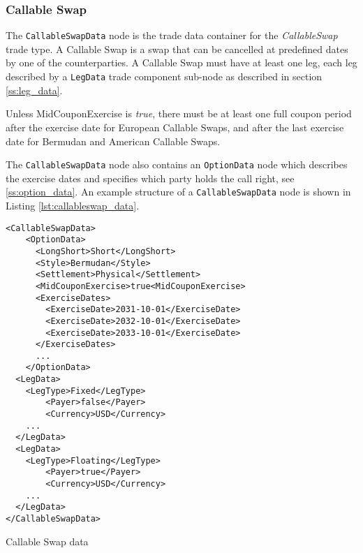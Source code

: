 \subsubsection{Callable Swap}\label{ss:callable_swap}

\ifdefined{}\fi

The \lstinline!CallableSwapData! node is the trade data container for the \emph{CallableSwap} trade type. A Callable Swap is a
 swap that can be cancelled at predefined dates by one of the counterparties. A Callable Swap must have at least one leg, each leg described by a \lstinline!LegData! trade component sub-node as described in section
\ref{ss:leg_data}.  

Unless MidCouponExercise is \emph{true}, there must be at least one full coupon period after the exercise date for European Callable Swaps, and after the last exercise date for Bermudan and American Callable Swaps. 

The \lstinline!CallableSwapData! node also contains an \lstinline!OptionData! node which describes
the exercise dates and specifies which party holds the call right, see \ref{ss:option_data}. An example structure of a
\lstinline!CallableSwapData! node is shown in Listing \ref{lst:callableswap_data}.

\begin{listing}[H]
\begin{verbatim}
<CallableSwapData>
    <OptionData>
      <LongShort>Short</LongShort>
      <Style>Bermudan</Style>
      <Settlement>Physical</Settlement>
      <MidCouponExercise>true<MidCouponExercise>
      <ExerciseDates>
        <ExerciseDate>2031-10-01</ExerciseDate>
        <ExerciseDate>2032-10-01</ExerciseDate>
        <ExerciseDate>2033-10-01</ExerciseDate>
      </ExerciseDates>
      ...
    </OptionData>
  <LegData>
	<LegType>Fixed</LegType>
        <Payer>false</Payer>    
        <Currency>USD</Currency>	
	...
  </LegData>
  <LegData>
	<LegType>Floating</LegType>
        <Payer>true</Payer>     
        <Currency>USD</Currency>	
	...
  </LegData>
</CallableSwapData>
\end{verbatim}
\caption{Callable Swap data}
\label{lst:callableswap_data}
\end{listing}



